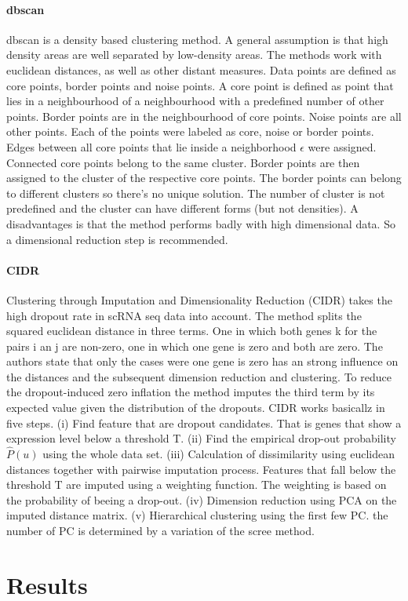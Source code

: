 \documentclass{article}\usepackage[]{graphicx}\usepackage[]{color}
\begin{document}
\paragraph{dbscan}
dbscan is a density based clustering method. A general assumption is that high density areas are well separated by low-density areas.  The methods work with euclidean distances, as well as other distant measures. Data points are defined as core points, border points and noise points. A core point is defined as point that lies in a neighbourhood of a neighbourhood with a predefined number of other points. Border points are in the neighbourhood of core points. Noise points are all other points. 
Each of the points were labeled as core, noise or border points. Edges between all core points that lie inside a neighborhood $\epsilon$ were assigned. Connected core points belong to the same cluster. Border points are then assigned to the cluster of the respective core points. The border points can belong to different clusters so there's no unique solution. The number of cluster is not predefined and the cluster can have different forms (but not densities). A disadvantages is that the method performs badly with high dimensional data. So a dimensional reduction step is recommended.
\paragraph{CIDR}
Clustering through Imputation and Dimensionality Reduction (CIDR) takes the high dropout rate in scRNA seq data into account. The method splits the squared euclidean distance in three terms. One in which both genes k for the pairs i an j are non-zero, one in which one gene is zero and both are zero. The authors state that only the cases were one gene is zero has an strong influence on the distances and the subsequent  dimension reduction and clustering. To reduce the dropout-induced zero inflation the method imputes the third term by its expected value given the distribution of the dropouts. CIDR works basicallz in five steps. (i) Find feature that are dropout candidates. That is genes that show a expression level below a threshold T. (ii) Find the empirical drop-out probability $\hat P(u)$ using the whole data set. (iii) Calculation of dissimilarity using euclidean distances together with pairwise imputation process. Features that fall below the threshold T are imputed using a weighting function. The weighting is based on the probability of beeing a drop-out. (iv) Dimension reduction using PCA on the imputed distance matrix. (v) Hierarchical clustering using the first few PC. the number of PC is determined by a variation of the scree method.
\section{Results}
\end{document}

